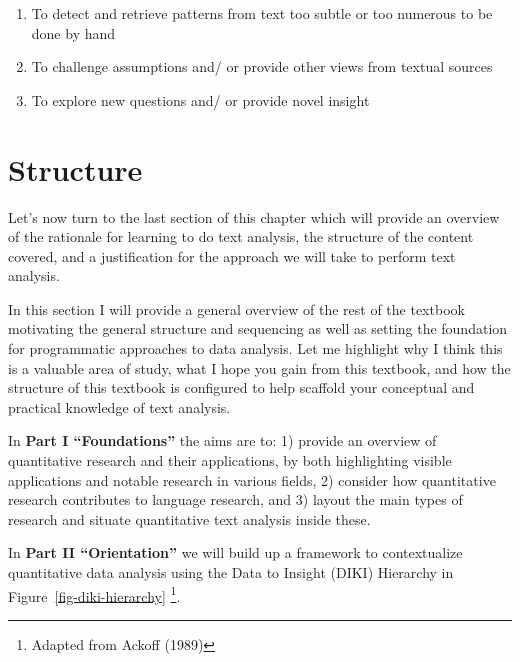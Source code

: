 \documentclass[
  letterpaper,
]{scrbook}
\providecommand{\tightlist}{%
  \setlength{\itemsep}{0pt}\setlength{\parskip}{0pt}}\usepackage{longtable,booktabs,array}
\begin{document}
\begin{enumerate}
\def\labelenumi{\arabic{enumi}.}
\tightlist
\item
  To detect and retrieve patterns from text too subtle or too numerous
  to be done by hand
\item
  To challenge assumptions and/ or provide other views from textual
  sources
\item
  To explore new questions and/ or provide novel insight
\end{enumerate}

\hypertarget{structure}{%
\section{Structure}\label{structure}}

Let's now turn to the last section of this chapter which will provide an
overview of the rationale for learning to do text analysis, the
structure of the content covered, and a justification for the approach
we will take to perform text analysis.

In this section I will provide a general overview of the rest of the
textbook motivating the general structure and sequencing as well as
setting the foundation for programmatic approaches to data analysis. Let
me highlight why I think this is a valuable area of study, what I hope
you gain from this textbook, and how the structure of this textbook is
configured to help scaffold your conceptual and practical knowledge of
text analysis.

In \textbf{Part I ``Foundations''} the aims are to: 1) provide an
overview of quantitative research and their applications, by both
highlighting visible applications and notable research in various
fields, 2) consider how quantitative research contributes to language
research, and 3) layout the main types of research and situate
quantitative text analysis inside these.

In \textbf{Part II ``Orientation''} we will build up a framework to
contextualize quantitative data analysis using the Data to Insight
(DIKI) Hierarchy in Figure~\ref{fig-diki-hierarchy} \footnote{Adapted
  from Ackoff (1989)}.
\end{document}
